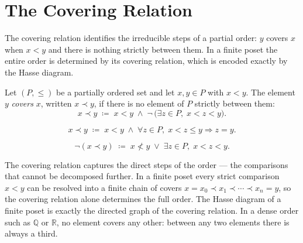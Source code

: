 
\section{The Covering Relation}
\label{sec:covering-relation}

\begin{tcolorbox}[
  colback=gray!6,
  colframe=gray!40,
  arc=2pt,
  left=8pt, right=8pt, top=6pt, bottom=6pt,
  title={\small\textbf{Toolkit: The Covering Relation}},
  fonttitle=\small\bfseries
]
The covering relation identifies the irreducible steps of a partial order:
$y$ covers $x$ when $x < y$ and there is nothing strictly between them.
In a finite poset the entire order is determined by its covering relation,
which is encoded exactly by the Hasse diagram.
\end{tcolorbox}


\begin{tcolorbox}[colback=defbox, colframe=defborder, arc=2pt,
  left=6pt, right=6pt, top=4pt, bottom=4pt,
  title={\small\textbf{Definition (Covering Relation)}},
  fonttitle=\small\bfseries]
\begin{definition}
\label{def:covering-relation}
Let $(P, \leq)$ be a partially ordered set and let $x, y \in P$ with
$x < y$.  The element $y$ \emph{covers} $x$, written $x \prec y$, if
there is no element of $P$ strictly between them:
\[
x \prec y
\;\coloneqq\;
x < y
\;\land\;
\neg\,\bigl(\exists z \in P,\; x < z < y\bigr).
\]
\end{definition}
\end{tcolorbox}

\begin{remark*}
\[
x \prec y
\;\coloneqq\;
x < y
\;\land\;
\forall z \in P,\; x < z \leq y \Longrightarrow z = y.
\]
\end{remark*}

\begin{remark*}
\[
\neg(x \prec y)
\;\coloneqq\;
x \not< y \;\lor\; \exists z \in P,\; x < z < y.
\]
\end{remark*}

\begin{remark*}[Interpretation]
The covering relation captures the direct steps of the order — the
comparisons that cannot be decomposed further.  In a finite poset every
strict comparison $x < y$ can be resolved into a finite chain of covers
$x = x_0 \prec x_1 \prec \cdots \prec x_n = y$, so the covering relation
alone determines the full order.  The Hasse diagram of a finite poset is
exactly the directed graph of the covering relation.  In a dense order
such as $\mathbb{Q}$ or $\mathbb{R}$, no element covers any other: between
any two elements there is always a third.
\end{remark*}

